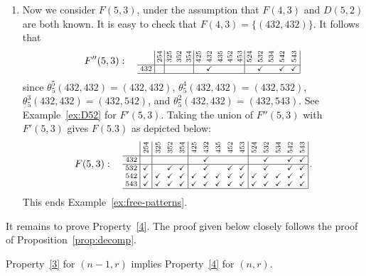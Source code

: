 \documentclass[ALCO,ThmDefs,Unicode,epreuves]{cedram}
\newcommand{\cm}{\checkmark}
\newcommand{\rt}[1]{\rotatebox{90}{#1}}
\begin{document}
\begin{exam}
\begin{enumerate}[label = (\alph*)]
\item \label{exam6.12_ii} 
Now we consider $F(5,3)$, under the assumption that $F(4,3)$ and
$D(5,2)$ are both known. It is easy to check that $F(4,3) = \{(432,
432)\}$. It follows that
 \[
 F'' (5,3): \quad
\text{\setlength{\arraycolsep}{2.7pt}\scriptsize
$\displaystyle 
\begin{array}{c|c|ccc|ccccc|ccccc|}
 &\rt{254}&\rt{325}&\rt{352}&\rt{354}%
 &\rt{425}&\rt{432}&\rt{435}&\rt{452}%
 &\rt{453}&\rt{524}&\rt{532}&\rt{534}%
 &\rt{542}&\rt{543}\\ \hline
 432 & && & &&\cm&& & &&\cm&&\cm&\cm \\ 
 \hline
\end{array}\,$}
 \]
since $\theta^5_5(432,432)=(432,432)$,
$\theta^4_5(432,432)=(432,532)$, $\theta^3_5(432,432)=(432,542)$, and
$\theta^2_5(432,432)=(432,543)$. See Example~\ref{ex:D52} for
$F'(5,3)$. Taking the union of $F''(5,3)$ with $F'(5,3)$ gives
$F(5.3)$ as depicted below:
\[
 F(5,3): \quad
\text{\setlength{\arraycolsep}{2.7pt}\scriptsize
$\displaystyle 
\begin{array}{c|c|ccc|ccccc|ccccc|}
 &\rt{254}&\rt{325}&\rt{352}&\rt{354}%
 &\rt{425}&\rt{432}&\rt{435}&\rt{452}%
 &\rt{453}&\rt{524}&\rt{532}&\rt{534}%
 &\rt{542}&\rt{543}\\ \hline
 432 & && & &&\cm&& & &&\cm&&\cm&\cm \\ \hline
 532 &\cm &&\cm&\cm &&\cm&&\cm&\cm &&\cm&&\cm&\cm \\ 
 542 &\cm &\cm&\cm&\cm &\cm&\cm&\cm&\cm&\cm &\cm&\cm&\cm&\cm&\cm \\
 543 &\cm &\cm&\cm&\cm &\cm&\cm&\cm&\cm&\cm &\cm&\cm&\cm&\cm&\cm \\ \hline
\end{array}\,.$}
\]
This ends Example~\ref{ex:free-patterns}.
\end{enumerate}
\end{exam}




It remains to prove Property~\ref{4}. The proof given below closely
follows the proof of Proposition~\ref{prop:decomp}.


\begin{prop}\label{prop:property-4}
Property~\ref{3} for $(n-1,r)$ implies Property~\ref{4} for $(n,r)$.
\end{prop}
\end{document}
